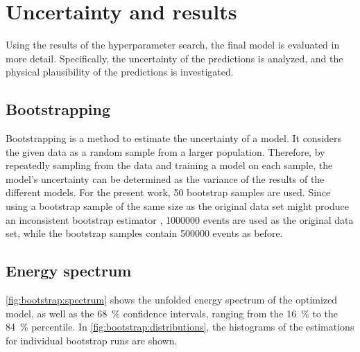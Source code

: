 \section{Uncertainty and results}
Using the results of the hyperparameter search,
the final model is evaluated in more detail.
Specifically,
  the uncertainty of the predictions is analyzed, %
  and the physical plausibility of the predictions is investigated.


\subsection{Bootstrapping}
Bootstrapping \cite{bootstrap} is a method to estimate the uncertainty of a model.
It considers the given data as a random sample from a larger population.
Therefore,
by repeatedly sampling from the data and training a model on each sample,
the model's uncertainty can be determined
as the variance of the results of the different models.
%
For the present work, \num{50} bootstrap samples are used. %
Since using a bootstrap sample of the same size as the original data set
might produce an inconsistent bootstrap estimator \cite{bootstrap_samplesize},
\num{1000000} events are used as the original data set,
while the bootstrap samples contain \num{500000} events as before.


\subsection{Energy spectrum}
\autoref{fig:bootstrap:spectrum} shows the unfolded energy spectrum of the optimized model,
as well as the \SI{68}{\percent} confidence intervals,
  ranging from the \SI{16}{\percent} to the \SI{84}{\percent} percentile.
In \autoref{fig:bootstrap:distributions},
the histograms of the estimations for individual bootstrap runs are shown.

\blindtext[2]

